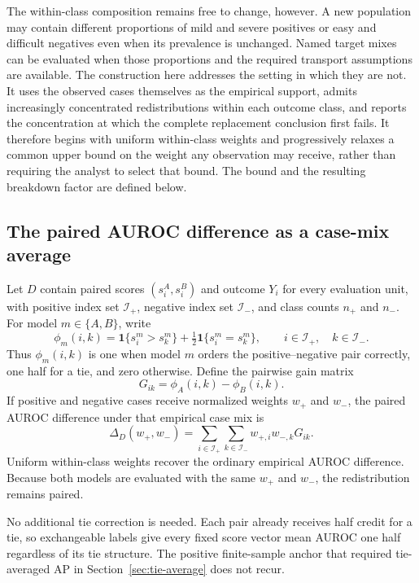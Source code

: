 \documentclass[11pt]{article}
\theoremstyle{remark}
\begin{document}
The within-class composition remains free to change, however. A new population
may contain different proportions of mild and severe positives or easy and
difficult negatives even when its prevalence is unchanged. Named target mixes
can be evaluated when those proportions and the required transport assumptions
are available. The construction here addresses the setting in which they are
not. It uses the observed cases themselves as the empirical support, admits
increasingly concentrated redistributions within each outcome class, and
reports the concentration at which the complete replacement conclusion first
fails. It therefore begins with uniform within-class weights and progressively
relaxes a common upper bound on the weight any observation may receive, rather
than requiring the analyst to select that bound. The bound and the resulting
breakdown factor are defined below.

\subsection{The paired AUROC difference as a case-mix average}

Let $D$ contain paired scores $(s_i^A,s_i^B)$ and outcome $Y_i$ for every
evaluation unit, with positive index set $\mathcal I_+$, negative index set
$\mathcal I_-$, and class counts $n_+$ and $n_-$. For model $m\in\{A,B\}$,
write
\[
\phi_m(i,k)
=
\mathbf 1\{s_i^m>s_k^m\}
+\tfrac12\mathbf 1\{s_i^m=s_k^m\},
\qquad i\in\mathcal I_+,\quad k\in\mathcal I_-.
\]
Thus $\phi_m(i,k)$ is one when model $m$ orders the positive--negative
pair correctly, one half for a tie, and zero otherwise. Define the pairwise
gain matrix
\[
G_{ik}=\phi_A(i,k)-\phi_B(i,k).
\]
If positive and negative cases receive normalized weights $w_+$ and $w_-$,
the paired AUROC difference under that empirical case mix is
\begin{equation}
\Delta_D(w_+,w_-)
=
\sum_{i\in\mathcal I_+}\sum_{k\in\mathcal I_-}
w_{+,i}w_{-,k}G_{ik}.
\label{eq:auroc-weighted-difference}
\end{equation}
Uniform within-class weights recover the ordinary empirical AUROC difference.
Because both models are evaluated with the same $w_+$ and $w_-$, the
redistribution remains paired.

No additional tie correction is needed. Each pair already receives half credit
for a tie, so exchangeable labels give every fixed score vector mean AUROC one
half regardless of its tie structure. The positive finite-sample anchor that
required tie-averaged AP in Section~\ref{sec:tie-average} does not recur.
\end{document}
